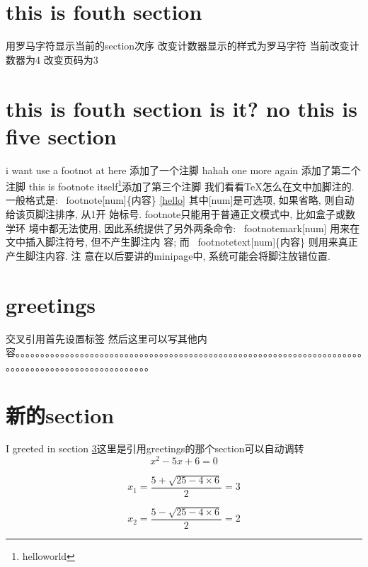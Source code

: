 \documentclass{article}
\begin{document}
\section{this is fouth section}
用罗马字符显示当前的section次序
\renewcommand\thesection{\Roman{section}}改变计数器显示的样式为罗马字符
\setcounter{section}{4}当前改变计数器为4
\setcounter{page}{3}改变页码为3
\section{this is fouth section is it? no this is five section}
i want use a footnot at here
添加了一个注脚
\footnotemark
hahah one more again
添加了第二个注脚
\footnotemark
this is footnote itself\footnote{helloworld}添加了第三个注脚
我们看看TeX怎么在文中加脚注的. 一般格式是:
\label{hello}\  footnote[num]\{内容\}
\ref{hello}
其中[num]是可选项, 如果省略, 则自动给该页脚注排序, 从1开
始标号. footnote只能用于普通正文模式中, 比如盒子或数学环
境中都无法使用, 因此系统提供了另外两条命令:
\ footnotemark[num] 用来在文中插入脚注符号, 但不产生脚注内
容; 而 \  footnotetext[num]\{内容\} 则用来真正产生脚注内容. 注
意在以后要讲的minipage中, 系统可能会将脚注放错位置. 
\section{greetings}
\label{sec:greetings}交叉引用首先设置标签
 然后这里可以写其他内容。。。。。。。。。。。。。。。。。。。。。。。。。。。。。。。。。。。。。。。。。。。。。。。。。。。。。。。。。。。。。。。。。。。。。。。。。。。。。。。。。。。。。。。。。。。。。。。。。。。

\section{新的section}
 
I greeted in section \ref{sec:greetings}这里是引用greetings的那个section可以自动调转
\begin{equation} \label{eq:solve}
x^2 - 5 x + 6 = 0
\end{equation}
 
\begin{equation}
x_1 = \frac{5 + \sqrt{25 - 4 \times 6}}{2} = 3
\end{equation}
 
\begin{equation}
x_2 = \frac{5 - \sqrt{25 - 4 \times 6}}{2} = 2
\end{equation}
 
\end{document}

